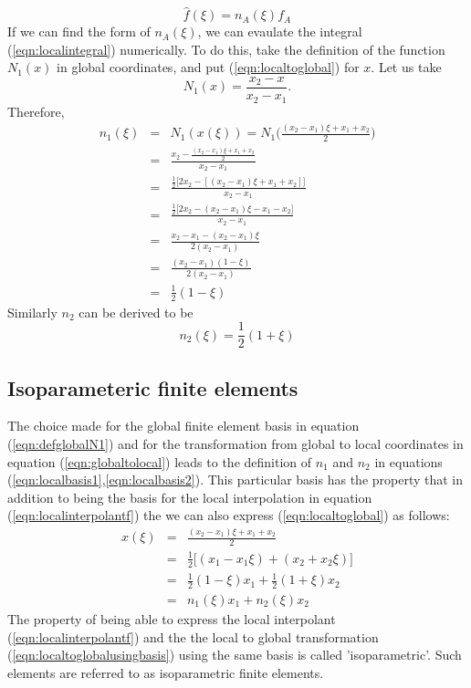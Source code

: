 \documentclass{article}
\newcommand{\beq}{\begin{equation}}
\newcommand{\eeq}{\end{equation}}
\newcommand{\ber}{\begin{eqnarray}}
\newcommand{\eer}{\end{eqnarray}}
\begin{document}
\beq
\label{eqn:localinterpolantf}
\hat{f}(\xi) = n_A(\xi)f_A
\eeq
If we can find the form of $n_A(\xi)$, we can evaulate the integral (\ref{eqn:localintegral}) numerically. To do this, take the definition of the function $N_1(x)$ in global coordinates, and put (\ref{eqn:localtoglobal}) for $x$. Let us take
\beq
\label{eqn:defglobalN1}
N_1(x) = \frac{x_2 - x}{x_2 - x_1}.
\eeq
Therefore,
\ber
n_1(\xi)&=&N_1(x(\xi)) = N_1\Big(\frac{(x_2 - x_1)\xi + x_1 + x_2}{2}\Big) \nonumber \\
        &=& \frac{x_2 - \frac{(x_2-x_1)\xi + x_1 + x_2}{2}}{x_2-x_1} \nonumber \\
        &=& \frac{\frac{1}{2}\Big[2x_2-[(x_2-x_1)\xi + x_1 + x_2]\Big]}{x_2-x_1} \nonumber \\
        &=& \frac{\frac{1}{2}\Big[2x_2-(x_2-x_1)\xi - x_1 - x_2\Big]}{x_2-x_1} \nonumber \\
        &=& \frac{x_2 - x_1 - (x_2-x_1)\xi}{2(x_2 - x_1)} \nonumber \\
        &=& \frac{(x_2-x_1)(1-\xi)}{2(x_2 - x_1)} \nonumber \\
        &=& \frac{1}{2}(1-\xi) \label{eqn:localbasis1}
\eer
Similarly $n_2$ can be derived to be
\beq
\label{eqn:localbasis2}
n_2(\xi) = \frac{1}{2}(1+\xi)
\eeq
\subsection{Isoparameteric finite elements}
The choice made for the global finite element basis in equation (\ref{eqn:defglobalN1}) and for the transformation from global to local coordinates in equation (\ref{eqn:globaltolocal}) leads to the definition of $n_1$ and $n_2$ in equations (\ref{eqn:localbasis1},\ref{eqn:localbasis2}). This particular basis has the property that in addition to being the basis for the local interpolation in equation (\ref{eqn:localinterpolantf}) the we can also express (\ref{eqn:localtoglobal}) as follows:
\ber
x(\xi) &=& \frac{(x_2 - x_1)\xi + x_1 + x_2}{2} \nonumber \\
       &=& \frac{1}{2}\Big[(x_1 - x_1\xi) + (x_2 + x_2\xi)\Big] \nonumber \\
       &=& \frac{1}{2}(1-\xi)x_1 + \frac{1}{2}(1+\xi)x_2 \nonumber \\
       &=& n_1(\xi)x_1 + n_2(\xi)x_2 \label{eqn:localtoglobalusingbasis}
\eer
The property of being able to express the local interpolant (\ref{eqn:localinterpolantf}) and the the local to global transformation (\ref{eqn:localtoglobalusingbasis}) using the same basis is called 'isoparametric'. Such elements are referred to as isoparametric finite elements.
\end{document}
